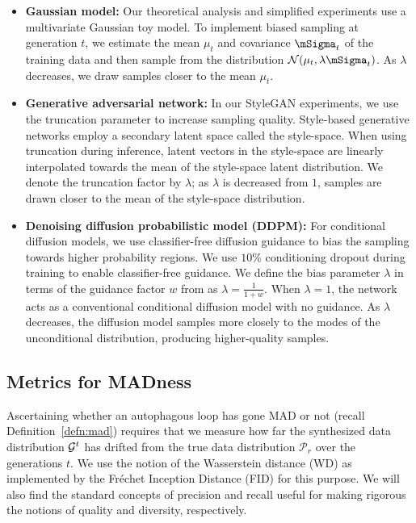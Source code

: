 \documentclass{article}
\def\bias{{\lambda}}
\begin{document}
\begin{itemize}

\item \textbf{Gaussian model:} 
Our theoretical analysis and simplified experiments use a multivariate Gaussian toy model. 
To implement biased sampling at generation $t$, we estimate the mean $\mu_t$ and covariance $\mSigma_t$ of the training data and then sample from the distribution $\mathcal{N}(\mu_t, \bias\mSigma_t)$. 
As $\bias$ decreases, we draw samples closer to the mean $\mu_t$.

\item \textbf{Generative adversarial network:} 
In our StyleGAN experiments, we use the truncation parameter to increase sampling quality. 
Style-based generative networks employ a secondary latent space called the style-space. 
When using truncation during inference, latent vectors in the style-space are linearly interpolated towards the mean of the style-space latent distribution. 
We denote the truncation factor by $\bias$; as $\bias$ is decreased from $1$, samples are drawn closer to the mean of the style-space distribution. 

\item \textbf{Denoising diffusion probabilistic model (DDPM):} 
For conditional diffusion models, we use classifier-free diffusion guidance \cite{classifier_free_guidance} to bias the sampling towards higher probability regions. 
We use $10\%$ conditioning dropout during training to enable classifier-free guidance. 
We define the bias parameter $\lambda$ in terms of the guidance factor $w$ from \cite{classifier_free_guidance} as $\lambda = \frac{1}{1+w}$. When $\bias = 1$, the network acts as a conventional conditional diffusion model with no guidance. 
As $\bias$ decreases, the diffusion model samples more closely to the modes of the unconditional distribution, producing higher-quality samples.

\end{itemize}


\subsection{Metrics for MADness}


Ascertaining whether an autophagous loop has gone MAD or not (recall Definition~\ref{defn:mad}) requires that we measure how far the synthesized data distribution $\mathcal{G}^t$ has drifted from the true data distribution $\mathcal{P}_r$ over the generations $t$.
We use the notion of the Wasserstein distance (WD) as implemented by the Fréchet Inception Distance (FID) for this purpose.
We will also find the standard concepts of precision and recall useful for making rigorous the notions of quality and diversity, respectively. 
\end{document}
